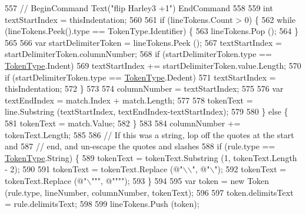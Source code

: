 \begin{DoxyCode}
557                         \textcolor{comment}{//    BeginCommand Text("flip Harley3 +1") EndCommand}
558 
559                         \textcolor{keywordtype}{int} textStartIndex = thisIndentation;
560 
561                         \textcolor{keywordflow}{if} (lineTokens.Count > 0) \{
562                             \textcolor{keywordflow}{while} (lineTokens.Peek().type == TokenType.Identifier) \{
563                                 lineTokens.Pop ();
564                             \}
565 
566                             var startDelimiterToken = lineTokens.Peek ();
567                             textStartIndex = startDelimiterToken.columnNumber;
568                             \textcolor{keywordflow}{if} (startDelimiterToken.type == \hyperlink{a00040_a301aa7c866593a5b625a8fc158bbeace}{TokenType}.Indent)
569                                 textStartIndex += startDelimiterToken.value.Length;
570                             \textcolor{keywordflow}{if} (startDelimiterToken.type == \hyperlink{a00040_a301aa7c866593a5b625a8fc158bbeace}{TokenType}.Dedent)
571                                 textStartIndex = thisIndentation;
572                         \}
573 
574                         columnNumber = textStartIndex;
575 
576                         var textEndIndex = match.Index + match.Length;
577 
578                         tokenText = line.Substring (textStartIndex, textEndIndex-textStartIndex);
579 
580                     \} \textcolor{keywordflow}{else} \{
581                         tokenText = match.Value;
582                     \}
583 
584                     columnNumber += tokenText.Length;
585 
586                     \textcolor{comment}{// If this was a string, lop off the quotes at the start and}
587                     \textcolor{comment}{// end, and un-escape the quotes and slashes}
588                     \textcolor{keywordflow}{if} (rule.type == \hyperlink{a00040_a301aa7c866593a5b625a8fc158bbeace}{TokenType}.String) \{
589                         tokenText = tokenText.Substring (1, tokenText.Length - 2);
590 
591                         tokenText = tokenText.Replace (\textcolor{stringliteral}{@"\(\backslash\)\(\backslash\)"}, \textcolor{stringliteral}{@"\(\backslash\)"});
592                         tokenText = tokenText.Replace (\textcolor{stringliteral}{@"\(\backslash\)"""}, \textcolor{stringliteral}{@""""});
593                     \}
594 
595                     var token = \textcolor{keyword}{new} Token (rule.type, lineNumber, columnNumber, tokenText);
596 
597                     token.delimitsText = rule.delimitsText;
598 
599                     lineTokens.Push (token);

\end{DoxyCode}
